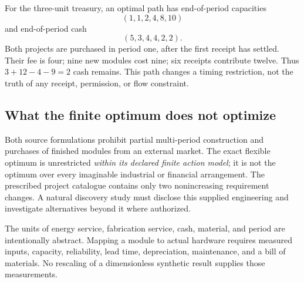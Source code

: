 \documentclass[11pt,letterpaper]{article}
\newcommand{\1}{\mathbf 1}
\theoremstyle{remark}\newtheorem{remark}{Remark}[section]
\begin{document}
For the three-unit treasury, an optimal path has end-of-period capacities
\begin{equation}
 (1,1,2,4,8,10)
\end{equation}
and end-of-period cash
\begin{equation}
 (5,3,4,4,2,2).
\end{equation}
Both projects are purchased in period one, after the first receipt has settled. Their fee is four; nine new modules cost nine; six receipts contribute twelve. Thus $3+12-4-9=2$ cash remains. This path changes a timing restriction, not the truth of any receipt, permission, or flow constraint.

\subsection{What the finite optimum does not optimize}
Both source formulations prohibit partial multi-period construction and purchases of finished modules from an external market. The exact flexible optimum is unrestricted \emph{within its declared finite action model}; it is not the optimum over every imaginable industrial or financial arrangement. The prescribed project catalogue contains only two nonincreasing requirement changes. A natural discovery study must disclose this supplied engineering and investigate alternatives beyond it where authorized.

The units of energy service, fabrication service, cash, material, and period are intentionally abstract. Mapping a module to actual hardware requires measured inputs, capacity, reliability, lead time, depreciation, maintenance, and a bill of materials. No rescaling of a dimensionless synthetic result supplies those measurements.
\end{document}
